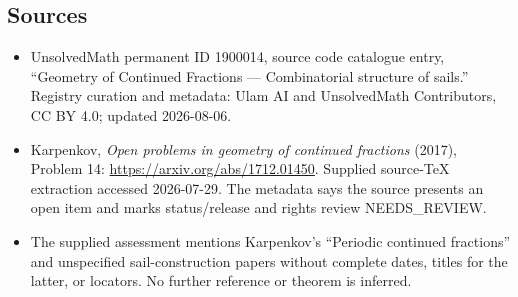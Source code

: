 \documentclass[11pt]{article}
\begin{document}
\subsection{Sources}
\begin{itemize}
\item UnsolvedMath permanent ID 1900014, source code catalogue entry, ``Geometry of Continued Fractions --- Combinatorial structure of sails.'' Registry curation and metadata: Ulam AI and UnsolvedMath Contributors, CC BY 4.0; updated 2026-08-06.
\item Karpenkov, \emph{Open problems in geometry of continued fractions} (2017), Problem 14: \url{https://arxiv.org/abs/1712.01450}. Supplied source-TeX extraction accessed 2026-07-29. The metadata says the source presents an open item and marks status/release and rights review NEEDS\_REVIEW.
\item The supplied assessment mentions Karpenkov's ``Periodic continued fractions'' and unspecified sail-construction papers without complete dates, titles for the latter, or locators. No further reference or theorem is inferred.
\end{itemize}
\end{document}
